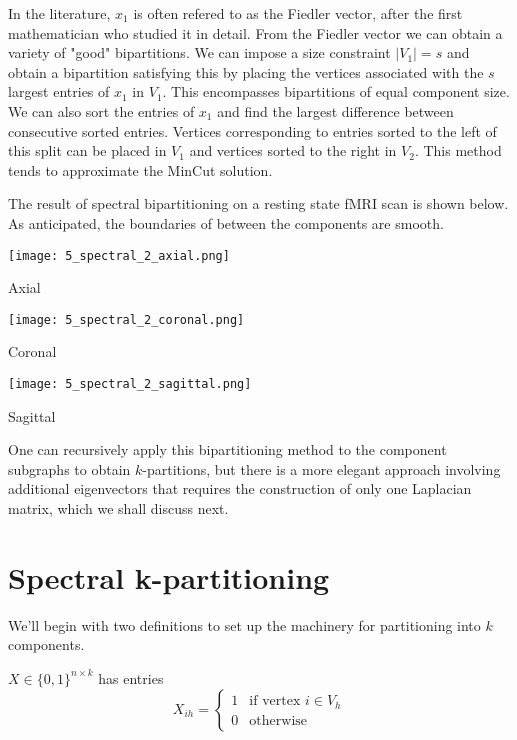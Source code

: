 In the literature, $x_1$ is often refered to as the Fiedler vector,
after the first mathematician who studied it in detail.
From the Fiedler vector we can obtain a variety of "good" bipartitions.
We can impose a size constraint $|V_1| = s$ and obtain a bipartition
satisfying this by placing the vertices associated with the $s$ largest
entries of $x_1$ in $V_1$. This encompasses bipartitions of equal
component size. We can also sort the entries of $x_1$ and find the
largest difference between consecutive sorted entries. Vertices
corresponding to entries sorted to the left of this split can be placed
in $V_1$ and vertices sorted to the right in $V_2$. This method tends to
approximate the MinCut solution.

The result of spectral bipartitioning on a resting state fMRI scan
is shown below. As anticipated, the boundaries of between the
components are smooth.

\begin{center}
\texttt{[image: 5\_spectral\_2\_axial.png]}

Axial

\texttt{[image: 5\_spectral\_2\_coronal.png]}

Coronal

\texttt{[image: 5\_spectral\_2\_sagittal.png]}

Sagittal
\end{center}

One can recursively apply this bipartitioning method to the component
subgraphs to obtain $k$-partitions, but there is a more elegant
approach involving additional eigenvectors that requires the
construction of only one Laplacian matrix, which we shall discuss next.

\section{Spectral k-partitioning}

We'll begin with two definitions to set up the machinery for
partitioning into $k$ components.

\begin{definition}
 $X \in \{0, 1\}^{n \times k}$ has entries
\[ X_{ih} = \begin{cases}
		1 & \mbox{if vertex } i \in V_h \\
		0 & \mbox{otherwise}
\end{cases} \]
\end{definition}

